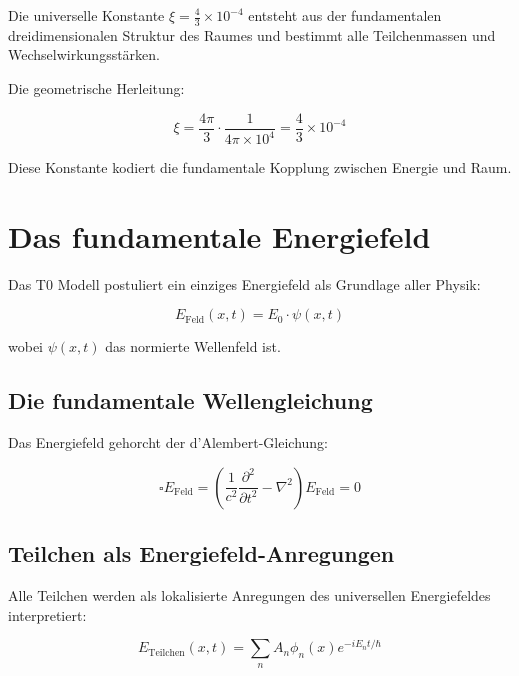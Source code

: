 	\begin{erkenntnis}
		Die universelle Konstante $\xi = \frac{4}{3} \times 10^{-4}$ entsteht aus der fundamentalen dreidimensionalen Struktur des Raumes und bestimmt alle Teilchenmassen und Wechselwirkungsstärken.
	\end{erkenntnis}
	
	Die geometrische Herleitung:
	
	\begin{equation}
		\xi = \frac{4\pi}{3} \cdot \frac{1}{4\pi \times 10^4} = \frac{4}{3} \times 10^{-4}
	\end{equation}
	
	Diese Konstante kodiert die fundamentale Kopplung zwischen Energie und Raum.
	
	
	\section{Das fundamentale Energiefeld}
	
	Das T0 Modell postuliert ein einziges Energiefeld als Grundlage aller Physik:
	
	\begin{equation}
		E_{\text{Feld}}(x,t) = E_0 \cdot \psi(x,t)
	\end{equation}
	
	wobei $\psi(x,t)$ das normierte Wellenfeld ist.
	
	\subsection{Die fundamentale Wellengleichung}
	
	Das Energiefeld gehorcht der d'Alembert-Gleichung:
	
	\begin{equation}
		\square E_{\text{Feld}} = \left(\frac{1}{c^2}\frac{\partial^2}{\partial t^2} - \nabla^2\right) E_{\text{Feld}} = 0
	\end{equation}
	
	\subsection{Teilchen als Energiefeld-Anregungen}
	
	Alle Teilchen werden als lokalisierte Anregungen des universellen Energiefeldes interpretiert:
	
	\begin{equation}
		E_{\text{Teilchen}}(x,t) = \sum_n A_n \phi_n(x) e^{-iE_n t/\hbar}
	\end{equation}
	
